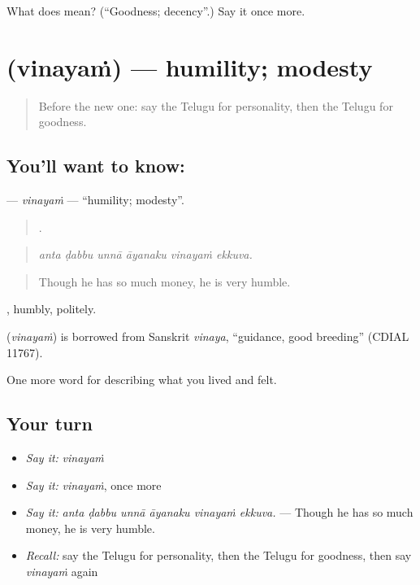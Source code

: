 \begin{tcolorbox}[breakable,colback=teal!4,colframe=teal!35!black,title={Before you move on}]
What does  mean? (\textquotedblleft{}Goodness; decency\textquotedblright{}.) Say it once more.
\end{tcolorbox}
\section[\texorpdfstring{\te{వినయం} (vinayaṁ)}{వినయం (vinayaṁ)}]{ (vinayaṁ) — humility; modesty}

\label{lesson:TE-C507-vinayam}



\begin{quote}
Before the new one: say the Telugu for personality, then the Telugu for goodness.
\end{quote}

\subsection*{You'll want to know: }
\textbf{} — \emph{vinayaṁ} — \textquotedblleft{}humility; modesty\textquotedblright{}.

\begin{quote}
     .
\end{quote}

\begin{quote}
\emph{anta ḍabbu unnā āyanaku vinayaṁ ekkuva.}
\end{quote}

\begin{quote}
Though he has so much money, he is very humble.
\end{quote}

, humbly, politely.

\begin{cousinweb}
\textbf{} (\emph{vinayaṁ}) is borrowed from Sanskrit \emph{vinaya}, \textquotedblleft{}guidance, good breeding\textquotedblright{} (CDIAL 11767).
\end{cousinweb}

\begin{grammarlens}[title={What you've built}]
One more word for describing what you lived and felt.
\end{grammarlens}

\subsection*{Your turn}
\begin{itemize}
\raggedright
  \item \emph{Say it:} \emph{vinayaṁ}
  \item \emph{Say it:} \emph{vinayaṁ}, once more
  \item \emph{Say it:} \emph{anta ḍabbu unnā āyanaku vinayaṁ ekkuva.} — Though he has so much money, he is very humble.
  \item \emph{Recall:} say the Telugu for personality, then the Telugu for goodness, then say \emph{vinayaṁ} again
\end{itemize}

